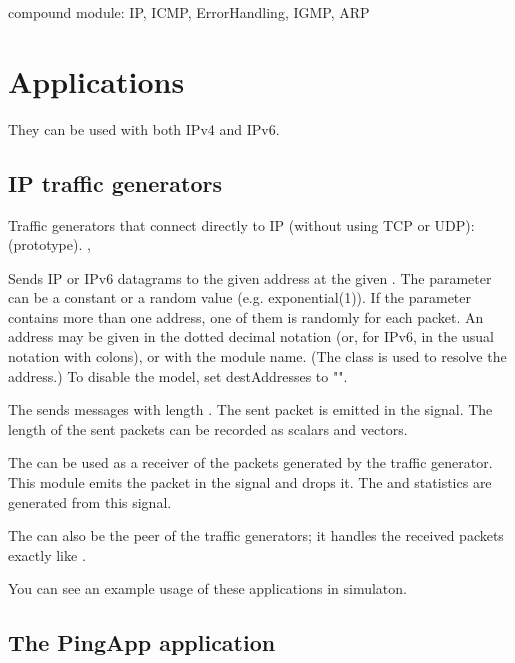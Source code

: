 compound module: IP, ICMP, ErrorHandling, IGMP, ARP

\section{Applications}

They can be used with both IPv4 and IPv6.

\subsection{IP traffic generators}

Traffic generators that connect directly to IP (without using TCP or UDP):
 (prototype).
 ,

Sends IP or IPv6 datagrams to the given address at the given .
The  parameter can be a constant or a random value (e.g. exponential(1)).
If the  parameter contains more than one address, one
of them is randomly for each packet. An address may be given in the
dotted decimal notation (or, for IPv6, in the usual notation with colons),
or with the module name. (The  class is used to resolve
the address.) To disable the model, set destAddresses to "".

The  sends messages with length .
The sent packet is emitted in the  signal.
The length of the sent packets can be recorded as scalars and vectors.


The  can be used as a receiver of the packets
generated by the traffic generator. This module emits the packet
in the  signal and drops it. The 
and  statistics are generated from this signal.

The  can also be the peer of the traffic generators;
it handles the received packets exactly like .

You can see an example usage of these applications in 
simulaton.

\subsection{The PingApp application}

